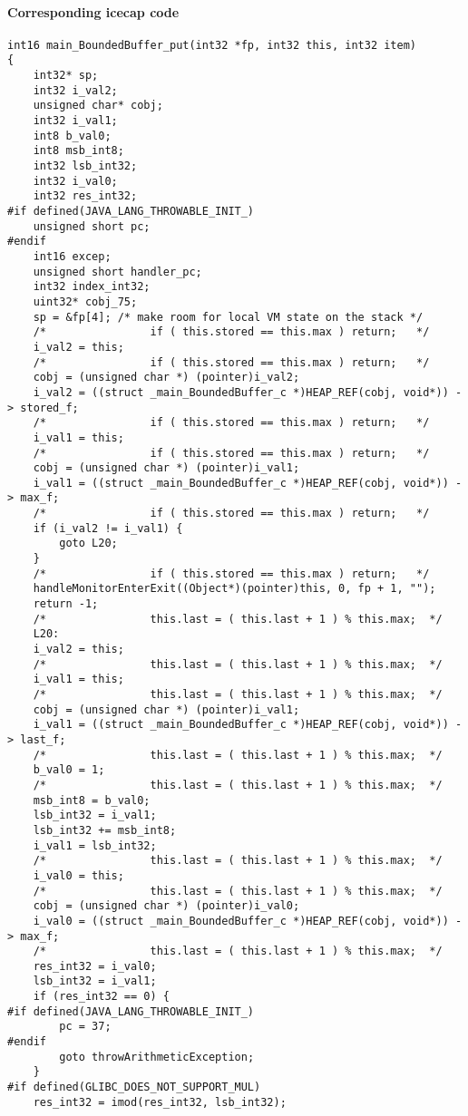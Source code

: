 \paragraph{Corresponding icecap code}\hfill
\begin{lstlisting}[firstnumber=55202]
int16 main_BoundedBuffer_put(int32 *fp, int32 this, int32 item)
{
	int32* sp;
	int32 i_val2;
	unsigned char* cobj;
	int32 i_val1;
	int8 b_val0;
	int8 msb_int8;
	int32 lsb_int32;
	int32 i_val0;
	int32 res_int32;
#if defined(JAVA_LANG_THROWABLE_INIT_)
	unsigned short pc;
#endif
	int16 excep;
	unsigned short handler_pc;
	int32 index_int32;
	uint32* cobj_75;
	sp = &fp[4]; /* make room for local VM state on the stack */
	/*                if ( this.stored == this.max ) return;   */
	i_val2 = this;
	/*                if ( this.stored == this.max ) return;   */
	cobj = (unsigned char *) (pointer)i_val2;
	i_val2 = ((struct _main_BoundedBuffer_c *)HEAP_REF(cobj, void*)) -> stored_f;
	/*                if ( this.stored == this.max ) return;   */
	i_val1 = this;
	/*                if ( this.stored == this.max ) return;   */
	cobj = (unsigned char *) (pointer)i_val1;
	i_val1 = ((struct _main_BoundedBuffer_c *)HEAP_REF(cobj, void*)) -> max_f;
	/*                if ( this.stored == this.max ) return;   */
	if (i_val2 != i_val1) {
		goto L20;
	}
	/*                if ( this.stored == this.max ) return;   */
	handleMonitorEnterExit((Object*)(pointer)this, 0, fp + 1, "");
	return -1;
	/*                this.last = ( this.last + 1 ) % this.max;  */
	L20:
	i_val2 = this;
	/*                this.last = ( this.last + 1 ) % this.max;  */
	i_val1 = this;
	/*                this.last = ( this.last + 1 ) % this.max;  */
	cobj = (unsigned char *) (pointer)i_val1;
	i_val1 = ((struct _main_BoundedBuffer_c *)HEAP_REF(cobj, void*)) -> last_f;
	/*                this.last = ( this.last + 1 ) % this.max;  */
	b_val0 = 1;
	/*                this.last = ( this.last + 1 ) % this.max;  */
	msb_int8 = b_val0;
	lsb_int32 = i_val1;
	lsb_int32 += msb_int8;
	i_val1 = lsb_int32;
	/*                this.last = ( this.last + 1 ) % this.max;  */
	i_val0 = this;
	/*                this.last = ( this.last + 1 ) % this.max;  */
	cobj = (unsigned char *) (pointer)i_val0;
	i_val0 = ((struct _main_BoundedBuffer_c *)HEAP_REF(cobj, void*)) -> max_f;
	/*                this.last = ( this.last + 1 ) % this.max;  */
	res_int32 = i_val0;
	lsb_int32 = i_val1;
	if (res_int32 == 0) {
#if defined(JAVA_LANG_THROWABLE_INIT_)
		pc = 37;
#endif
		goto throwArithmeticException;
	}
#if defined(GLIBC_DOES_NOT_SUPPORT_MUL)
	res_int32 = imod(res_int32, lsb_int32);

\end{lstlisting}
